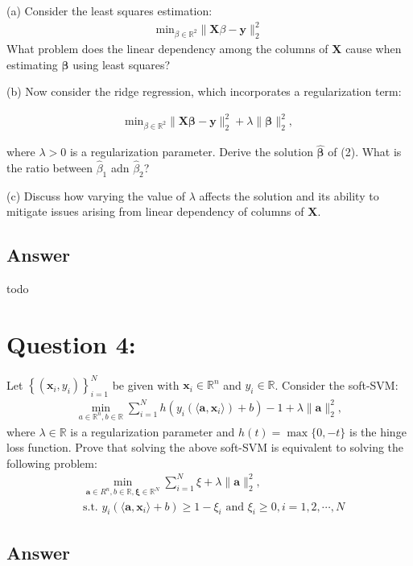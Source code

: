 \documentclass[a4paper,12pt]{article}
\newcommand{\R}{\mathbb{R}}
\begin{document}
(a) Consider the least squares estimation:
\begin{align}
    \text{min}_{\beta \in \R^2}\|\bm{X}\beta - \bm{y}\|_2^2 
\end{align}
What problem does the linear dependency among the columns of \(\bm{X}\) cause when estimating \(\bm{\beta}\) using least squares?

(b) Now consider the ridge regression, which incorporates a regularization term:

\begin{align}
    \text{min}_{\beta \in \R^2}\|\bm{X}\bm{\beta} - \bm{y}\|_2^2 + \lambda\|\bm{\beta}\|_2^2,
\end{align}

where \(\lambda > 0\) is a regularization parameter. Derive the solution \(\hat{\bm{\beta}}\) of (2). What is the ratio between \(\hat{\beta}_1\) adn \(\hat{\beta}_2\)?

(c) Discuss how varying the value of \(\lambda\) affects the solution and its ability to mitigate issues arising from linear dependency of columns of \(\bm{X}\).

\subsection*{Answer}
todo

\section*{Question 4:}
Let \(\left\{(\bm{x}_i, y_i)\right\}_{i=1}^N\) be given with \(\bm{x}_i \in \R^n\) and \(y_i \in \R\). Consider the soft-SVM:
\begin{align*}
    \min_{a\in\R^n, b\in \R} \sum_{i=1}^N h(y_i(\langle \bm{a}, \bm{x}_i\rangle) + b) - 1 + \lambda\|\bm{a}\|_2^2,
\end{align*}
where \(\lambda \in \R\) is a regularization parameter and \(h(t) = \max\{0, -t\}\) is the hinge loss function. Prove that solving the above soft-SVM is equivalent to solving the following problem:
\begin{align*}
    &\min_{\bm{a} \in R^n, b \in \R, \bm{\xi} \in \R^N} \sum_{i = 1}^N \xi + \lambda\|\bm{a}\|_2^2, \\
    &\text{s.t. } y_i(\langle \bm{a}, \bm{x}_i\rangle + b) \geq 1 - \xi_i \text{ and } \xi_i \geq 0, i = 1,2,\cdots,N
\end{align*}

\subsection*{Answer}
\end{document}
